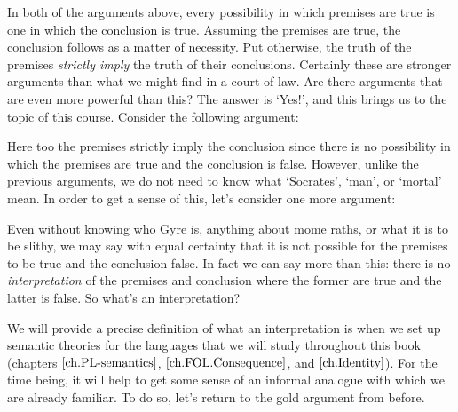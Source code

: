 \begin{earg}
\end{earg}


\begin{earg}
\end{earg}

In both of the arguments above, every possibility in which premises are true is one in which the conclusion is true.
Assuming the premises are true, the conclusion follows as a matter of necessity.
Put otherwise, the truth of the premises \emph{strictly imply} the truth of their conclusions.
Certainly these are stronger arguments than what we might find in a court of law.
Are there arguments that are even more powerful than this?
The answer is `Yes!', and this brings us to the topic of this course.
Consider the following argument:

\begin{earg}
\end{earg}

Here too the premises strictly imply the conclusion since there is no possibility in which the premises are true and the conclusion is false.
However, unlike the previous arguments, we do not need to know what `Socrates', `man', or `mortal' mean.
In order to get a sense of this, let's consider one more argument:

\begin{earg}
\end{earg}

Even without knowing who Gyre is, anything about mome raths, or what it is to be slithy, we may say with equal certainty that it is not possible for the premises to be true and the conclusion false.
In fact we can say more than this: there is no \textit{interpretation} of the premises and conclusion where the former are true and the latter is false.
So what's an interpretation?

We will provide a precise definition of what an interpretation is when we set up semantic theories for the languages that we will study throughout this book (chapters $\ref{ch.PL-semantics}$, $\ref{ch.FOL.Consequence}$, and $\ref{ch.Identity}$).
For the time being, it will help to get some sense of an informal analogue with which we are already familiar.
To do so, let's return to the gold argument from before.

